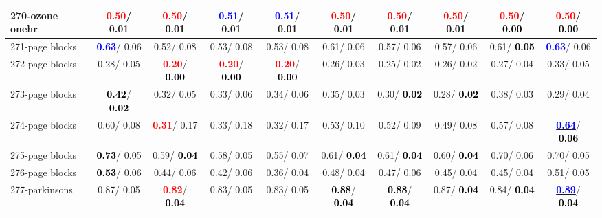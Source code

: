 \begin{table}[h]
\begin{center}
{\begin{tabular}{lc|c|c|c|c|c|c|c|c}
270-ozone onehr & \textcolor{red}{\textbf{  0.50}}/  0.01 & \textcolor{red}{\textbf{  0.50}}/  0.01 & \textcolor{blue}{\textbf{  0.51}}/  0.01 & \textcolor{blue}{\textbf{  0.51}}/  0.01 & \textcolor{red}{\textbf{  0.50}}/  0.01 & \textcolor{red}{\textbf{  0.50}}/  0.01 & \textcolor{red}{\textbf{  0.50}}/  0.01 & \textcolor{red}{\textbf{  0.50}}/\textcolor{black}{\textbf{  0.00}} & \textcolor{red}{\textbf{  0.50}}/\textcolor{black}{\textbf{  0.00}} \\ \hline
271-page blocks & \textcolor{blue}{\textbf{  0.63}}/  0.06 &   0.52/  0.08 &   0.53/  0.08 &   0.53/  0.08 &   0.61/  0.06 &   0.57/  0.06 &   0.57/  0.06 &   0.61/\textcolor{black}{\textbf{  0.05}} & \textcolor{blue}{\textbf{  0.63}}/  0.06 \\
272-page blocks &   0.28/  0.05 & \textcolor{red}{\textbf{  0.20}}/\textcolor{black}{\textbf{  0.00}} & \textcolor{red}{\textbf{  0.20}}/\textcolor{black}{\textbf{  0.00}} & \textcolor{red}{\textbf{  0.20}}/\textcolor{black}{\textbf{  0.00}} &   0.26/  0.03 &   0.25/  0.02 &   0.26/  0.02 &   0.27/  0.04 &   0.33/  0.05 \\
273-page blocks & \textcolor{black}{\textbf{  0.42}}/\textcolor{black}{\textbf{  0.02}} &   0.32/  0.05 &   0.33/  0.06 &   0.34/  0.06 &   0.35/  0.03 &   0.30/\textcolor{black}{\textbf{  0.02}} &   0.28/\textcolor{black}{\textbf{  0.02}} &   0.38/  0.03 &   0.29/  0.04 \\
274-page blocks &   0.60/  0.08 & \textcolor{red}{\textbf{  0.31}}/  0.17 &   0.33/  0.18 &   0.32/  0.17 &   0.53/  0.10 &   0.52/  0.09 &   0.49/  0.08 &   0.57/  0.08 & \underline{\textcolor{blue}{\textbf{  0.64}}}/\textcolor{black}{\textbf{  0.06}} \\
275-page blocks & \textcolor{black}{\textbf{  0.73}}/  0.05 &   0.59/\textcolor{black}{\textbf{  0.04}} &   0.58/  0.05 &   0.55/  0.07 &   0.61/\textcolor{black}{\textbf{  0.04}} &   0.61/\textcolor{black}{\textbf{  0.04}} &   0.60/\textcolor{black}{\textbf{  0.04}} &   0.70/  0.06 &   0.70/  0.05 \\
276-page blocks & \textcolor{black}{\textbf{  0.53}}/  0.06 &   0.44/  0.06 &   0.42/  0.06 &   0.36/  0.04 &   0.48/  0.04 &   0.47/  0.06 &   0.45/  0.04 &   0.45/  0.04 &   0.51/  0.05 \\
277-parkinsons &   0.87/  0.05 & \textcolor{red}{\textbf{  0.82}}/\textcolor{black}{\textbf{  0.04}} &   0.83/  0.05 &   0.83/  0.05 & \textcolor{black}{\textbf{  0.88}}/\textcolor{black}{\textbf{  0.04}} & \textcolor{black}{\textbf{  0.88}}/\textcolor{black}{\textbf{  0.04}} &   0.87/\textcolor{black}{\textbf{  0.04}} &   0.84/\textcolor{black}{\textbf{  0.04}} & \underline{\textcolor{blue}{\textbf{  0.89}}}/\textcolor{black}{\textbf{  0.04}} \\ \hline

\end{tabular}}
\end{center}
\end{table}
